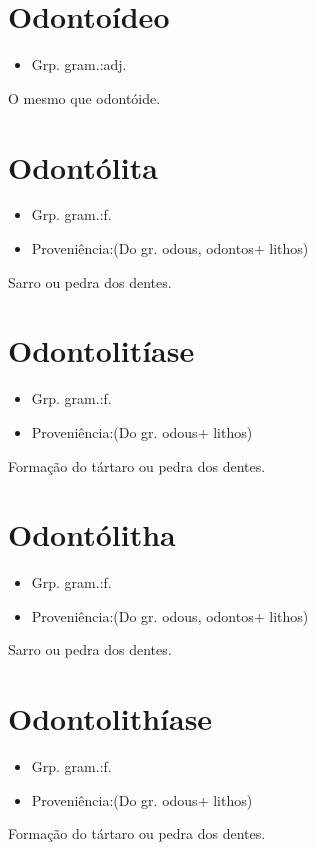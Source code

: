 \section{Odontoídeo}
\begin{itemize}
\item {Grp. gram.:adj.}
\end{itemize}
O mesmo que \textunderscore odontóide\textunderscore .
\section{Odontólita}
\begin{itemize}
\item {Grp. gram.:f.}
\end{itemize}
\begin{itemize}
\item {Proveniência:(Do gr. \textunderscore odous\textunderscore , \textunderscore odontos\textunderscore  + \textunderscore lithos\textunderscore )}
\end{itemize}
Sarro ou pedra dos dentes.
\section{Odontolitíase}
\begin{itemize}
\item {Grp. gram.:f.}
\end{itemize}
\begin{itemize}
\item {Proveniência:(Do gr. \textunderscore odous\textunderscore  + \textunderscore lithos\textunderscore )}
\end{itemize}
Formação do tártaro ou pedra dos dentes.
\section{Odontólitha}
\begin{itemize}
\item {Grp. gram.:f.}
\end{itemize}
\begin{itemize}
\item {Proveniência:(Do gr. \textunderscore odous\textunderscore , \textunderscore odontos\textunderscore  + \textunderscore lithos\textunderscore )}
\end{itemize}
Sarro ou pedra dos dentes.
\section{Odontolithíase}
\begin{itemize}
\item {Grp. gram.:f.}
\end{itemize}
\begin{itemize}
\item {Proveniência:(Do gr. \textunderscore odous\textunderscore  + \textunderscore lithos\textunderscore )}
\end{itemize}
Formação do tártaro ou pedra dos dentes.
